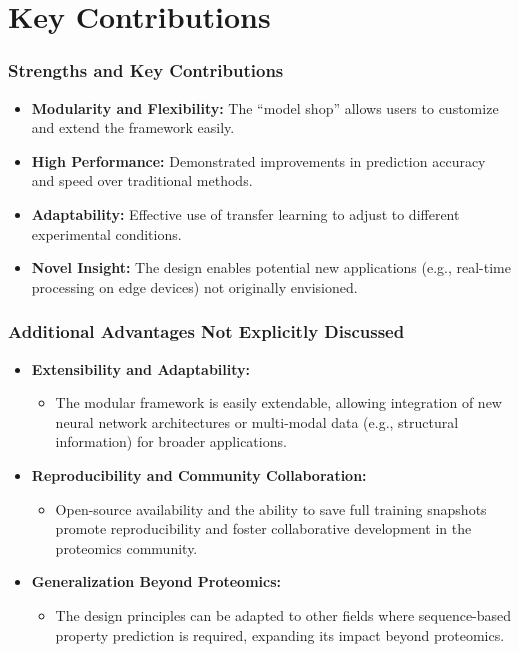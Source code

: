 \documentclass{beamer}
\begin{document}
\section{Key Contributions}
\begin{frame}
  \frametitle{Strengths and Key Contributions}
  \begin{itemize}
    \item \textbf{Modularity and Flexibility:} The “model shop” allows users to customize and extend the framework easily.
    \item \textbf{High Performance:} Demonstrated improvements in prediction accuracy and speed over traditional methods.
    \item \textbf{Adaptability:} Effective use of transfer learning to adjust to different experimental conditions.
    \item \textbf{Novel Insight:} The design enables potential new applications (e.g., real-time processing on edge devices) not originally envisioned.
  \end{itemize}
\end{frame}

\begin{frame}
  \frametitle{Additional Advantages Not Explicitly Discussed}
  \begin{itemize}
    \item \textbf{Extensibility and Adaptability:} 
      \begin{itemize}
        \item The modular framework is easily extendable, allowing integration of new neural network architectures or multi-modal data (e.g., structural information) for broader applications.
      \end{itemize}
    \item \textbf{Reproducibility and Community Collaboration:} 
      \begin{itemize}
        \item Open-source availability and the ability to save full training snapshots promote reproducibility and foster collaborative development in the proteomics community.
      \end{itemize}
    \item \textbf{Generalization Beyond Proteomics:} 
      \begin{itemize}
        \item The design principles can be adapted to other fields where sequence-based property prediction is required, expanding its impact beyond proteomics.
      \end{itemize}
  \end{itemize}
\end{frame}
\end{document}
